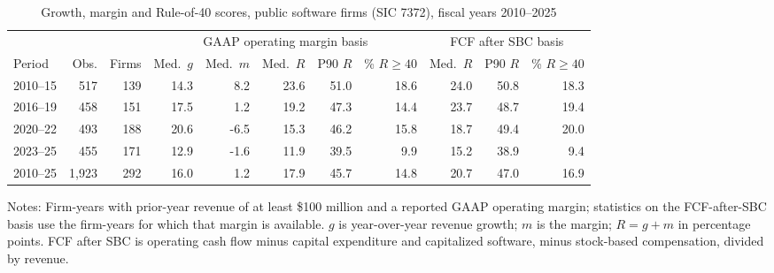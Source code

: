 \begin{table}[t]\centering\small
\caption{Growth, margin and Rule-of-40 scores, public software firms (SIC 7372), fiscal years 2010--2025}\label{tab:desc}
\begin{tabular}{lrrrrrrrrrr}\toprule
 & & & \multicolumn{5}{c}{GAAP operating margin basis} & \multicolumn{3}{c}{FCF after SBC basis}\\
\cmidrule(lr){4-8}\cmidrule(lr){9-11}
Period & Obs. & Firms & Med.\ $g$ & Med.\ $m$ & Med.\ $R$ & P90 $R$ & \% $R\geq40$ & Med.\ $R$ & P90 $R$ & \% $R\geq40$\\\midrule
2010--15 & 517 & 139 & 14.3 & 8.2 & 23.6 & 51.0 & 18.6 & 24.0 & 50.8 & 18.3 \\
2016--19 & 458 & 151 & 17.5 & 1.2 & 19.2 & 47.3 & 14.4 & 23.7 & 48.7 & 19.4 \\
2020--22 & 493 & 188 & 20.6 & -6.5 & 15.3 & 46.2 & 15.8 & 18.7 & 49.4 & 20.0 \\
2023--25 & 455 & 171 & 12.9 & -1.6 & 11.9 & 39.5 & 9.9 & 15.2 & 38.9 & 9.4 \\
2010--25 & 1,923 & 292 & 16.0 & 1.2 & 17.9 & 45.7 & 14.8 & 20.7 & 47.0 & 16.9 \\
\bottomrule\end{tabular}
\par\vspace{2pt}\footnotesize\raggedright Notes: Firm-years with prior-year revenue of at least \$100 million and a reported GAAP operating margin; statistics on the FCF-after-SBC basis use the firm-years for which that margin is available. $g$ is year-over-year revenue growth; $m$ is the margin; $R=g+m$ in percentage points. FCF after SBC is operating cash flow minus capital expenditure and capitalized software, minus stock-based compensation, divided by revenue.
\end{table}